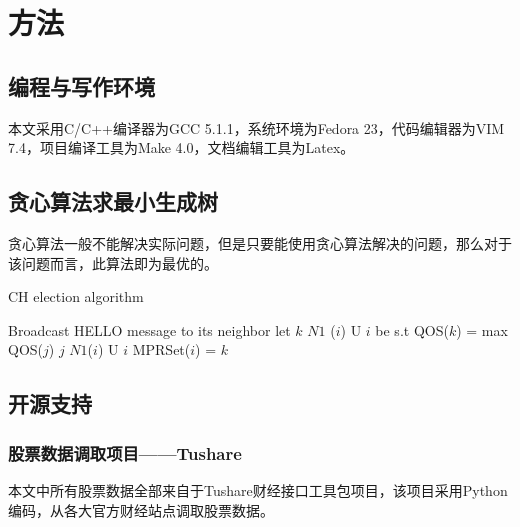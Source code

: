 \section{方法}
\subsection{编程与写作环境}
本文采用C/C++编译器为GCC 5.1.1，系统环境为Fedora 23，代码编辑器为VIM 7.4，项目编译工具为Make 4.0，文档编辑工具为Latex。
\subsection{贪心算法求最小生成树}
贪心算法一般不能解决实际问题，但是只要能使用贪心算法解决的问题，那么对于该问题而言，此算法即为最优的。
\begin{algorithm}
    \caption{CH election algorithm}
    \label{CHalgorithm}
    \begin{algorithmic}[1]
        \State Broadcast HELLO message to its neighbor
        \State let $k$  $N1$ ($i$) U {$i$} be s.t
        \State QOS($k$) = max {QOS($j$) \textbar $j$  $N1$($i$)  U $i$}
        \State MPRSet($i$) = $k$
        \EndFor
        \EndProcedure
    \end{algorithmic}
\end{algorithm}

\subsection{开源支持}
\subsubsection{股票数据调取项目——Tushare}
本文中所有股票数据全部来自于Tushare财经接口工具包项目，该项目采用Python编码，从各大官方财经站点调取股票数据。
